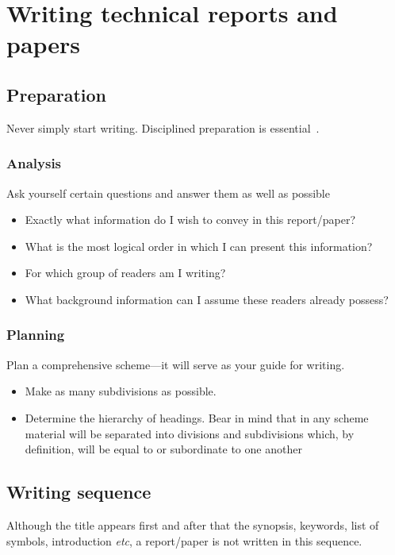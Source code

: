 \documentclass[a4paper,12pt]{article}
\begin{document}
\section{Writing technical reports and papers}
\label{cha:writing-reports}

\subsection{Preparation}
Never simply start writing.  Disciplined preparation is
essential~\cite{johnson}.

\subsubsection{Analysis}

Ask yourself certain questions and answer them as well as possible

\begin{itemize}
\item Exactly what information do I wish to convey in this
  report/paper?
\item What is the most logical order in which I can present this
  information?
\item For which group of readers am I writing?
\item What background information can I assume these readers already
  possess?
\end{itemize}

\subsubsection{Planning}
Plan a comprehensive scheme---it will serve as your guide for
writing.

\begin{itemize}
\item Make as many subdivisions as possible.
\item Determine the hierarchy of headings.  Bear in mind that in any
  scheme material will be separated into divisions and subdivisions
  which, by definition, will be equal to or subordinate to one another
\end{itemize}

\subsection{Writing sequence}
Although the title appears first and after that the synopsis,
keywords, list of symbols, introduction \emph{etc}, a report/paper is not
written in this sequence.
\end{document}
